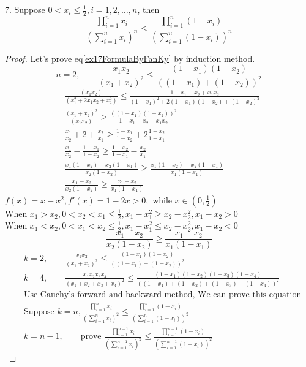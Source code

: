 \begin{example}
	7. Suppose $ 0<x_i\le \frac{1}{2}, i=1,2,\dots,n $, then
	\begin{equation}\label{ex17FormulaByFanKy}
		\frac{\prod_{i=1}^n x_i}{(\sum_{i=1}^n x_i)^n} \le \frac{\prod_{i=1}^n(1-x_i)}{(\sum_{i=1}^n(1-x_i))^n}
	\end{equation}
\begin{proof}
	Let's prove eq\ref{ex17FormulaByFanKy} by induction method.
	\begin{equation*}
		n=2,\qquad \frac{x_1x_2}{(x_1+x_2)^2}\le \frac{(1-x_1)(1-x_2)}{((1-x_1)+(1-x_2))^2}
	\end{equation*}
	\begin{align*}
		&\frac{(x_1x_2)}{(x_1^2+2x_1x_2+x_2^2)} \le \frac{1-x_1-x_2+x_1x_2}{(1-x_1)^2+2(1-x_1)(1-x_2)+(1-x_2)^2}\\
		&\frac{(x_1+x_2)^2}{(x_1x_2)} \ge \frac{((1-x_1)(1-x_2))^2}{1-x_1-x_2+x_1x_2}\\
		&\frac{x_1}{x_2} + 2 + \frac{x_2}{x_1} \ge \frac{1-x_1}{1-x_2} + 2\frac{1-x_2}{1-x_1}\\
		&\frac{x_1}{x_2} - \frac{1-x_1}{1-x_2} \ge \frac{1-x_2}{1-x_1} - \frac{x_2}{x_1}\\
		&\frac{x_1(1-x_2) - x_2(1-x_1)}{x_2(1-x_2)} \ge \frac{x_1(1-x_2)-x_2(1-x_1)}{x_1(1-x_1)}\\
		&\frac{x_1-x_2}{x_2(1-x_2)} \ge \frac{x_1 - x_2}{x_1(1-x_1)}
	\end{align*}
$ f(x) = x-x^2, f'(x) = 1-2x>0,\text{ while }x\in(0,\frac{1}{2})  $\\
When $ x_1>x_2 , 0<x_2<x_1\le \frac{1}{2}, x_1-x_1^2 \ge x_2-x_2^2, x_1-x_2>0$\\
When $ x_1<x_2 , 0<x_1<x_2\le \frac{1}{2}, x_1-x_1^2 \le x_2-x_2^2, x_1-x_2<0$\\
\begin{equation*}
	 \frac{x_1-x_2}{x_2(1-x_2)} \ge \frac{x_1 - x_2}{x_1(1-x_1)} 
\end{equation*}
\begin{align*}
	&k=2,\qquad \frac{x_1x_2}{(x_1+x_2)^2}\le \frac{(1-x_1)(1-x_2)}{((1-x_1)+(1-x_2))^2}\\
	&k=4,\qquad \frac{x_1x_2x_3x_4}{(x_1+x_2+x_3+x_4)^2}\le 
	\frac{(1-x_1)(1-x_2)(1-x_3)(1-x_4)}{((1-x_1)+(1-x_2)+(1-x_3)+(1-x_4))^2}\\
	&\text{Use Cauchy's forward and backward method, We can prove this equation}\\
	&\text{Suppose }k=n,\frac{\prod_{i=1}^n x_i}{(\sum_{i=1}^n x_i)^2} \le 
	\frac{\prod_{i=1}^n (1-x_i)}{(\sum_{i=1}^n (1-x_i))^2}\\
	&k = n-1,\qquad \text{prove  } \frac{\prod_{i=1}^{n-1} x_i}{(\sum_{i=1}^{n-1} x_i)^2} \le 
	\frac{\prod_{i=1}^{n-1} (1-x_i)}{(\sum_{i=1}^{n-1} (1-x_i))^2}
\end{align*}

\end{proof}
\end{example}
